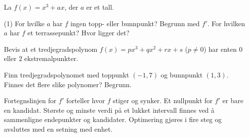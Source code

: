 
La $f(x) = x^3 + ax$, der $a$ er et tall.
\begin{tasks}(1)
  \task For hvilke $a$ har $f$ ingen topp- eller bunnpunkt? Begrunn med $f'$.
  \task For hvilken $a$ har $f$ et terrassepunkt? Hvor ligger det?
\end{tasks}

Bevis at et tredjegradspolynom $f(x) = px^3 + qx^2 + rx + s$ ($p \ne 0$) har enten $0$ eller $2$ ekstremalpunkter.

Finn tredjegradspolynomet med toppunkt $(-1, 7)$ og bunnpunkt $(1, 3)$. Finnes det flere slike polynomer? Begrunn.

\begin{oppsummering}
Fortegnslinjen for $f'$ forteller hvor $f$ stiger og synker. Et nullpunkt for $f'$ er bare en kandidat.
Største og minste verdi på et lukket intervall finnes ved å sammenligne endepunkter og kandidater.
Optimering gjøres i fire steg og avsluttes med en setning med enhet.
\end{oppsummering}
